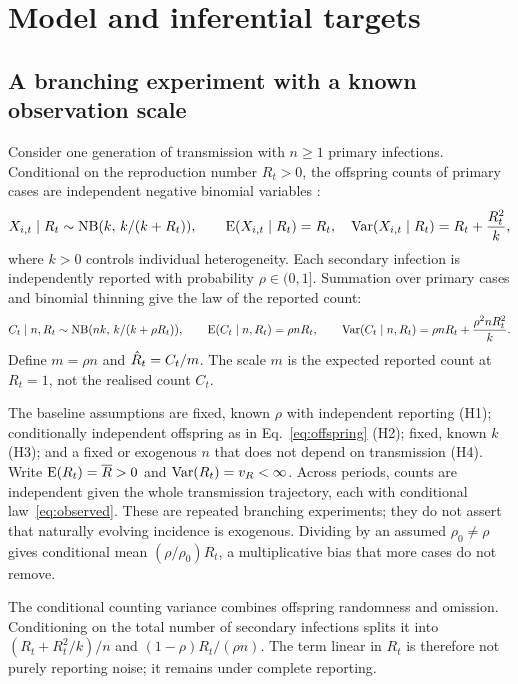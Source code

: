 \section{Model and inferential targets}
\label{sec:model}

\subsection{A branching experiment with a known observation scale}
\label{sec:model-branching}

Consider one generation of transmission with $n\ge1$ primary infections. Conditional on the reproduction number $R_t>0$, the offspring counts of primary cases are independent negative binomial variables \citep{lloydsmith2005superspreading}:
\begin{equation}
  X_{i,t}\mid R_t\sim\operatorname{NB}(k,\,k/(k+R_t)),\qquad
  \operatorname{E}(X_{i,t}\mid R_t)=R_t,\quad
  \operatorname{Var}(X_{i,t}\mid R_t)=R_t+\frac{R_t^2}{k},
  \label{eq:offspring}
\end{equation}
where $k>0$ controls individual heterogeneity. Each secondary infection is independently reported with probability $\rho\in(0,1]$. Summation over primary cases and binomial thinning give the law of the reported count:
\begin{equation}
  C_t\mid n,R_t\sim\operatorname{NB}(nk,\,k/(k+\rho R_t)),\qquad
  \operatorname{E}(C_t\mid n,R_t)=\rho nR_t,\qquad
  \operatorname{Var}(C_t\mid n,R_t)=\rho nR_t+\frac{\rho^2nR_t^2}{k}.
  \label{eq:observed}
\end{equation}
Define $m=\rho n$ and $\hat R_t=C_t/m$. The scale $m$ is the expected reported count at $R_t=1$, not the realised count $C_t$.

The baseline assumptions are fixed, known $\rho$ with independent reporting (H1); conditionally independent offspring as in Eq.~\eqref{eq:offspring} (H2); fixed, known $k$ (H3); and a fixed or exogenous $n$ that does not depend on transmission (H4). Write $\operatorname{E}(R_t)=\overline{R}>0$ and $\operatorname{Var}(R_t)=v_R<\infty$. Across periods, counts are independent given the whole transmission trajectory, each with conditional law~\eqref{eq:observed}. These are repeated branching experiments; they do not assert that naturally evolving incidence is exogenous. Dividing by an assumed $\rho_0\ne\rho$ gives conditional mean $(\rho/\rho_0)R_t$, a multiplicative bias that more cases do not remove.

The conditional counting variance combines offspring randomness and omission. Conditioning on the total number of secondary infections splits it into $(R_t+R_t^2/k)/n$ and $(1-\rho)R_t/(\rho n)$. The term linear in $R_t$ is therefore not purely reporting noise; it remains under complete reporting.

